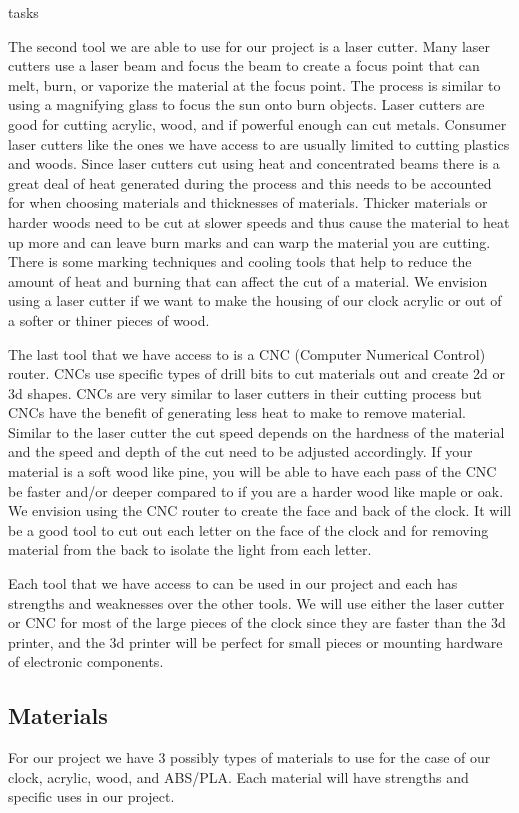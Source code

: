 tasks\documentclass[onecolumn, draftclsnofoot,10pt, compsoc]{IEEEtran}
\begin{document}
The second tool we are able to use for our project is a laser cutter.
Many laser cutters use a laser beam and focus the beam to create a focus point that can melt, burn, or vaporize the material at the focus point.
The process is similar to using a magnifying glass to focus the sun onto burn objects.
Laser cutters are good for cutting acrylic, wood, and if powerful enough can cut metals.
Consumer laser cutters like the ones we have access to are usually limited to cutting plastics and woods.
Since laser cutters cut using heat and concentrated beams there is a great deal of heat generated during the process and this needs to be accounted for when choosing materials and thicknesses of materials.
Thicker materials or harder woods need to be cut at slower speeds and thus cause the material to heat up more and can leave burn marks and can warp the material you are cutting.
There is some marking techniques and cooling tools that help to reduce the amount of heat and burning that can affect the cut of a material.
We envision using a laser cutter if we want to make the housing of our clock acrylic or out of a softer or thiner pieces of wood.

The last tool that we have access to is a CNC (Computer Numerical Control) router.
CNCs use specific types of drill bits to cut materials out and create 2d or 3d shapes.
CNCs are very similar to laser cutters in their cutting process but CNCs have the benefit of generating less heat to make to remove material.
Similar to the laser cutter the cut speed depends on the hardness of the material and the speed and depth of the cut need to be adjusted accordingly.
If your material is a soft wood like pine, you will be able to have each pass of the CNC be faster and/or deeper compared to if you are a harder wood like maple or oak.
We envision using the CNC router to create the face and back of the clock.
It will be a good tool to cut out each letter on the face of the clock and for removing material from the back to isolate the light from each letter.

Each tool that we have access to can be used in our project and each has strengths and weaknesses over the other tools.
We will use either the laser cutter or CNC for most of the large pieces of the clock since they are faster than the 3d printer, and the 3d printer will be perfect for small pieces or mounting hardware of electronic components.

\subsection{Materials}
For our project we have 3 possibly types of materials to use for the case of our clock, acrylic, wood, and ABS/PLA.
Each material will have strengths and specific uses in our project.
\end{document}

